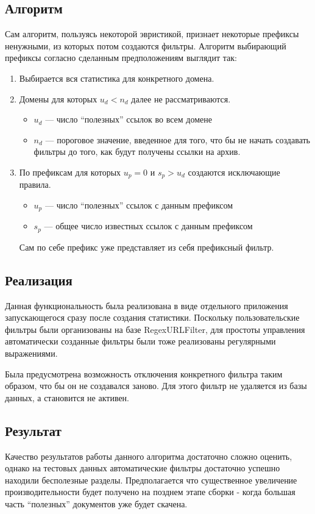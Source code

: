 \subsection{Алгоритм}
Сам алгоритм, пользуясь некоторой эвристикой, признает некоторые префиксы ненужными, из которых потом создаются фильтры.
Алгоритм выбирающий префиксы согласно сделанным предположениям выглядит так:
\begin{enumerate}
 \item Выбирается вся статистика для конкретного домена.
 \item Домены для которых $u_{d}<n_{d}$ далее не рассматриваются.
 \begin{itemize}
  \item $u_{d}$ --- число ``полезных'' ссылок во всем домене
  \item $n_{d}$ --- пороговое значение, введенное для того, что бы не начать создавать фильтры до того, как будут получены ссылки на архив.
 \end{itemize}

 \item По префиксам для которых $u_{p}=0$ и $s_{p}>u_{d}$ создаются исключающие правила.
 \begin{itemize}
  \item $u_{p}$ --- число ``полезных'' ссылок с данным префиксом
  \item $s_{p}$ --- общее число известных ссылок с данным префиксом
 \end{itemize}
 Сам по себе префикс уже представляет из себя префиксный фильтр.
\end{enumerate}


\subsection{Реализация}
Данная функциональность была реализована в виде отдельного приложения запускающегося сразу после создания статистики. Поскольку пользовательские фильтры были организованы на базе RegexURLFilter, для простоты управления автоматически созданные фильтры были тоже реализованы регулярными выражениями. 

Была предусмотрена возможность отключения конкретного фильтра таким образом, что бы он не создавался заново. Для этого фильтр не удаляется из базы данных, а становится не активен.

\subsection{Результат}
Качество результатов работы данного алгоритма достаточно сложно оценить, однако на тестовых данных автоматические фильтры достаточно успешно находили бесполезные разделы. Предполагается что существенное увеличение производительности будет получено на позднем этапе сборки - когда большая часть ``полезных'' документов уже будет скачена.
